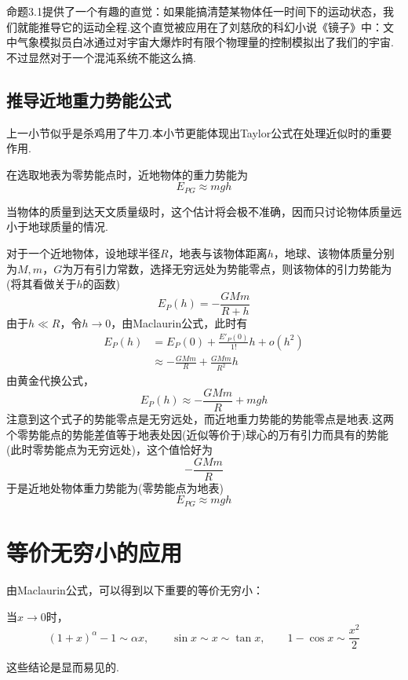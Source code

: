 命题3.1提供了一个有趣的直觉：如果能搞清楚某物体任一时间下的运动状态，我们就能推导它的运动全程.这个直觉被应用在了刘慈欣的科幻小说《镜子》\cite{liucixin}中：文中气象模拟员白冰通过对宇宙大爆炸时有限个物理量的控制模拟出了我们的宇宙.不过显然对于一个混沌系统不能这么搞.

\section{推导近地重力势能公式}

上一小节似乎是杀鸡用了牛刀.本小节更能体现出Taylor公式在处理近似时的重要作用.

\begin{proposition}
	在选取地表为零势能点时，近地物体的重力势能为$$E_{PG} \approx mgh$$
\end{proposition}
\begin{remark}
	当物体的质量到达天文质量级时，这个估计将会极不准确，因而只讨论物体质量远小于地球质量的情况.
\end{remark}

对于一个近地物体，设地球半径$R$，地表与该物体距离$h$，地球、该物体质量分别为$M,m$，$G$为万有引力常数，选择无穷远处为势能零点，则该物体的引力势能为(将其看做关于$h$的函数)$$E_P(h) = - \frac{GMm}{R+h}$$
由于$h \ll R$，令$h \to 0$，由Maclaurin公式，此时有
\begin{align*}
	E_P(h) &= E_P(0)+\frac{E'_P(0)}{1!}h + o(h^2) \\
	&\approx -\frac{GMm}{R} + \frac{GMm}{R^2} h
\end{align*}
由黄金代换公式，$$E_P(h) \approx -\frac{GMm}{R} + mgh$$
注意到这个式子的势能零点是无穷远处，而近地重力势能的势能零点是地表.这两个零势能点的势能差值等于地表处因(近似等价于)球心的万有引力而具有的势能(此时零势能点为无穷远处)，这个值恰好为$$-\frac{GMm}{R}$$
于是近地处物体重力势能为(零势能点为地表)$$E_{PG} \approx mgh$$

\chapter{等价无穷小的应用}

由Maclaurin公式，可以得到以下重要的等价无穷小：

\begin{proposition}
	当$x \to 0$时， 
	$$(1+x)^{\alpha} -1 \sim \alpha x, \qquad \sin x \sim x \sim\tan x, \qquad 1-\cos x \sim \dfrac{x^2}{2}$$
\end{proposition}

这些结论是显而易见的.




